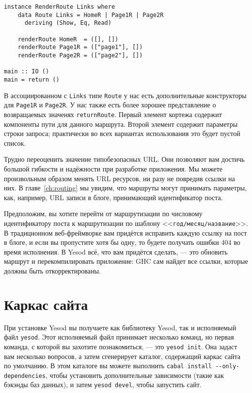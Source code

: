 \begin{lstlisting}
instance RenderRoute Links where
    data Route Links = HomeR | Page1R | Page2R
      deriving (Show, Eq, Read)

    renderRoute HomeR  = ([], [])
    renderRoute Page1R = (["page1"], [])
    renderRoute Page2R = (["page2"], [])

main :: IO ()
main = return ()
\end{lstlisting}

В ассоциированном с \lstinline!Links! типе \lstinline!Route! у нас есть дополнительные
конструкторы для \lstinline!Page1R! и \lstinline!Page2R!. У нас также есть более хорошее
представление о возвращаемых значенях \lstinline!returnRoute!. Первый элемент кортежа
содержит компоненты пути для данного маршрута. Второй элемент содержит параметры строки
запроса; практически во всех вариантах использования это будет пустой список.

Трудно переоценить значение типобезопасных URL. Они позволяют вам достичь большой гибкости
и надёжности при разработке приложения. Мы можете произвольным образом менять URL
ресурсов, ни разу не повредив ссылки на них. В главе~\ref{ch:routing} мы увидим, что
маршруты могут принимать параметры, как, например, URL записи в блоге, принимающий
идентификатор поста.

Предположим, вы хотите перейти от маршрутизации по числовому идентификатору поста к
маршрутизации по шаблону <<\texttt{год/месяц/название}>>. В традиционном веб-фреймворке
вам придётся исправить каждую ссылку на пост в блоге, и если вы пропустите хотя бы одну,
то будете получать ошибки 404 во время исполнения. В Yesod всё, что вам придётся сделать,
--- это обновить маршрут и перекомпилировать приложение: GHC сам найдет все ссылки,
которые должны быть откорректированы.

\section{Каркас сайта}

При установке Yesod вы получаете как библиотеку Yesod, так и исполняемый файл
\lstinline!yesod!. Этот исполняемый файл принимает несколько команд, но первая команда, с
которой вы захотите познакомиться, --- это \lstinline!yesod init!. Она задаст вам
несколько вопросов, а затем сгенерирует каталог, содержащий каркас сайта по умолчанию. В
этом каталоге вы можете выполнить \lstinline'cabal install --only-dependencies', чтобы
установить дополнительные зависимости (такие как бэкэнды баз данных), и затем
\lstinline'yesod devel', чтобы запустить сайт.

